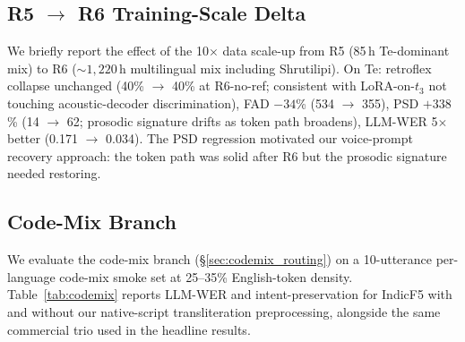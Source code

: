 \documentclass[conference,a4paper]{IEEEtran}
\begin{document}
\subsection{R5 $\to$ R6 Training-Scale Delta}
We briefly report the effect of the 10$\times$ data scale-up from R5 (85\,h Te-dominant mix) to R6 (${\sim}1{,}220$\,h multilingual mix including Shrutilipi). On Te: retroflex collapse unchanged (40\% $\to$ 40\% at R6-no-ref; consistent with LoRA-on-$t_3$ not touching acoustic-decoder discrimination), FAD $-34$\% (534 $\to$ 355), PSD $+338$\% (14 $\to$ 62; prosodic signature drifts as token path broadens), LLM-WER 5$\times$ better (0.171 $\to$ 0.034). The PSD regression motivated our voice-prompt recovery approach: the token path was solid after R6 but the prosodic signature needed restoring.

\subsection{Code-Mix Branch}
\label{sec:codemix_results}

We evaluate the code-mix branch (§\ref{sec:codemix_routing}) on a 10-utterance per-language code-mix smoke set at 25--35\% English-token density. Table~\ref{tab:codemix} reports LLM-WER and intent-preservation for IndicF5 with and without our native-script transliteration preprocessing, alongside the same commercial trio used in the headline results.
\end{document}
